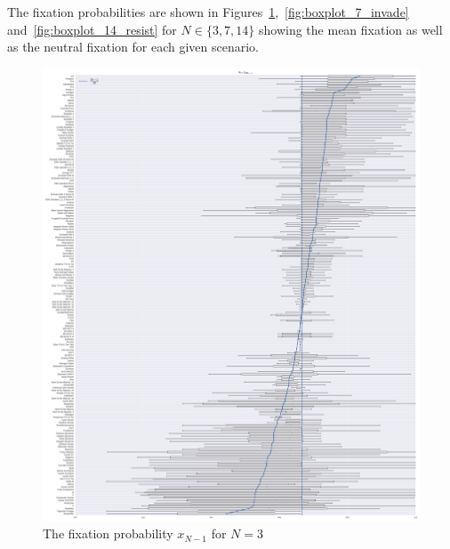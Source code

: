 \documentclass{article}
\begin{document}
The fixation
probabilities are shown in
Figures~\ref{fig:boxplot_3_resist},~\ref{fig:boxplot_7_invade}
and~\ref{fig:boxplot_14_resist} for \(N\in\{3, 7, 14\}\) showing the mean
fixation as well as the neutral fixation for each given scenario.

\begin{figure}[!hbtp]
    \centering
    \includegraphics[height=.8\textheight]{./img/boxplot_3_resist.pdf}
    \caption{The fixation probability \(x_{N-1}\) for \(N=3\)}
    \label{fig:boxplot_3_resist}
\end{figure}
\end{document}
